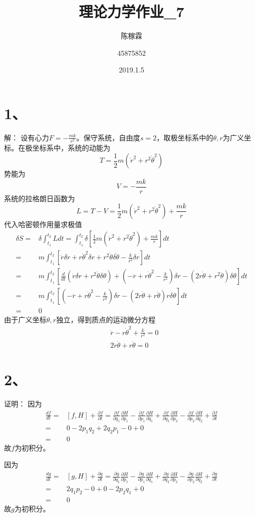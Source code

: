 \documentclass[10pt,a4paper]{article}
\title{理论力学作业\_7}
\author{陈稼霖 \and 45875852}
\date{2019.1.5}
\begin{document}
\maketitle
\section*{1、}解：
设有心力$F=-\frac{mk}{r^2}$。保守系统，自由度$s=2$，取极坐标系中的$\theta,r$为广义坐标。在极坐标系中，系统的动能为
\[
T=\frac{1}{2}m(\dot{r}^2+r^2\dot{\theta}^2)
\]
势能为
\[
V=-\frac{mk}{r}
\]
系统的拉格朗日函数为
\[
L=T-V=\frac{1}{2}m(\dot{r}^2+r^2\dot{\theta}^2)+\frac{mk}{r}
\]
代入哈密顿作用量求极值
\begin{align*}
\delta S=&\delta\int_{t_1}^{t_2}Ldt=\int_{t_1}^{t_2}\delta[\frac{1}{2}m(\dot{r}^2+r^2\dot{\theta}^2)+\frac{mk}{r}]dt\\
=&m\int_{t_1}^{t_2}[\dot{r}\delta\dot{r}+r\dot{\theta}^2\delta r+r^2\dot{\theta}\delta\dot{\theta}-\frac{k}{r^2}\delta r]dt\\
=&m\int_{t_1}^{t_2}[\frac{d}{dt}(\dot{r}\delta r+r^2\dot{\theta}\delta\theta)+(-\ddot{r}+r\dot{\theta}^2-\frac{k}{r^2})\delta r-(2r\dot{\theta}+r^2\ddot{\theta})\delta\theta]dt\\
=&m\int_{t_1}^{t_2}[(-\ddot{r}+r\dot{\theta}^2-\frac{k}{r^2})\delta r-(2\dot{r}\dot{\theta}+r\ddot{\theta})r\delta\theta]dt\\
=&0
\end{align*}
由于广义坐标$\theta,r$独立，得到质点的运动微分方程
\begin{align*}
&\ddot{r}-r\dot{\theta}^2+\frac{k}{r^2}=0\\
&2\dot{r}\dot{\theta}+r\ddot{\theta}=0
\end{align*}
\section*{2、}证明：
因为
\begin{align*}
\frac{df}{dt}=&[f,H]+\frac{\partial f}{\partial t}=\frac{\partial f}{\partial q_1}\frac{\partial H}{\partial p_1}-\frac{\partial f}{\partial p_1}\frac{\partial H}{\partial q_1}+\frac{\partial f}{\partial q_2}\frac{\partial H}{\partial p_2}-\frac{\partial f}{\partial p_2}\frac{\partial H}{\partial q_2}+\frac{\partial f}{\partial t}\\
=&0-2p_1q_2+2q_2p_1-0+0\\
=&0
\end{align*}
故$f$为初积分。

因为
\begin{align*}
\frac{dg}{dt}=&[g,H]+\frac{\partial g}{\partial t}=\frac{\partial g}{\partial q_1}\frac{\partial H}{\partial p_1}-\frac{\partial g}{\partial p_1}\frac{\partial H}{\partial q_1}+\frac{\partial g}{\partial q_2}\frac{\partial H}{\partial p_2}-\frac{\partial g}{\partial p_2}\frac{\partial H}{\partial q_2}+\frac{\partial g}{\partial t}\\
=&2q_1p_2-0+0-2p_2q_1+0\\
=&0
\end{align*}
故$g$为初积分。
\end{document}
